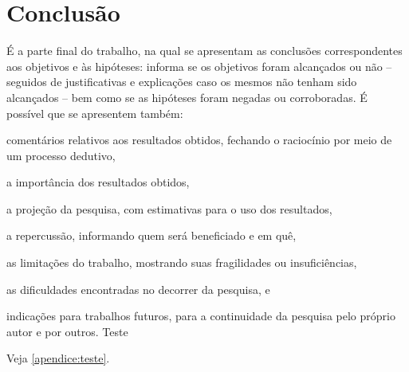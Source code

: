 \documentclass[12pt,oneside,a4paper,chapter=TITLE,section=TITLE,sumario
=tradicional]{abntex2}
\begin{document}
\chapter{Conclusão}

É a parte final do trabalho, na qual se apresentam as conclusões 
correspondentes aos objetivos e às hipóteses: informa se os objetivos foram 
alcançados ou não – seguidos de justificativas e explicações caso os mesmos não 
tenham sido alcançados – bem como se as hipóteses foram negadas ou 
corroboradas. É possível que se apresentem também:

\begin{lista}
    \item comentários relativos aos resultados obtidos, fechando o raciocínio 
    por meio de um processo dedutivo,
    
    \item a importância dos resultados obtidos,
    
    \item a projeção da pesquisa, com estimativas para o uso dos resultados,
    
    \item a repercussão, informando quem será beneficiado e em quê,
    
    \item as limitações do trabalho, mostrando suas fragilidades ou
insuficiências,
    \item as dificuldades encontradas no decorrer da pesquisa, e
    \item indicações para trabalhos futuros, para a continuidade da
pesquisa pelo próprio autor e por outros. Teste
\end{lista}

Veja \autoref{apendice:teste}.





\end{document}

